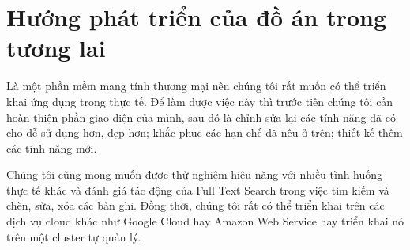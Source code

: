 \section{Hướng phát triển của đồ án trong tương lai}
Là một phần mềm mang tính thương mại nên chúng tôi rất muốn có thể
triển khai ứng dụng trong thực tế. Để làm được việc này thì trước tiên
chúng tôi cần hoàn thiện phần giao diện của mình, sau đó là chỉnh sửa lại
các tính năng đã có cho dễ sử dụng hơn, đẹp hơn; khắc phục
các hạn chế đã nêu ở trên; thiết kế thêm các tính năng mới.

Chúng tôi cũng mong muốn được thử nghiệm hiệu năng với nhiều tình
huống thực tế khác và đánh giá tác động của Full Text Search
trong việc tìm kiếm và chèn, sửa, xóa các bản ghi. Đồng thời,
chúng tôi rất có thể triển khai trên các dịch vụ cloud khác như
Google Cloud hay Amazon Web Service hay triển khai nó trên
một cluster tự quản lý.

